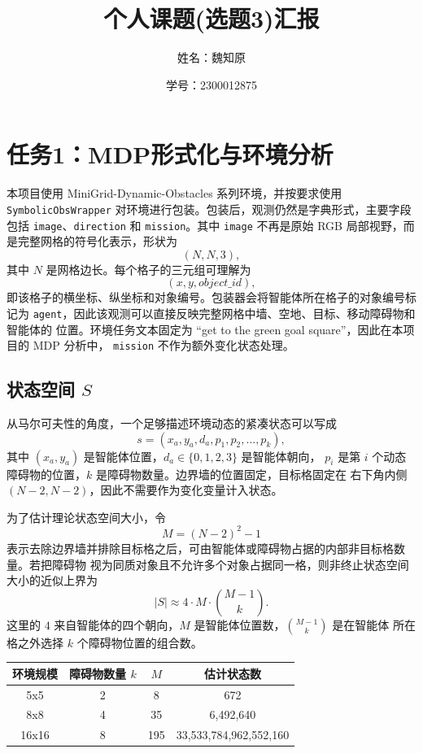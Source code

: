 \documentclass[UTF8,a4paper,fontset=fandol]{ctexart}
\title{个人课题(选题3)汇报}
\author{姓名：魏知原}
\date{学号：2300012875}
\begin{document}
\pagestyle{plain}
\maketitle

\section{任务1：MDP形式化与环境分析}

本项目使用 MiniGrid-Dynamic-Obstacles 系列环境，并按要求使用
\texttt{SymbolicObsWrapper} 对环境进行包装。包装后，观测仍然是字典形式，主要字段包括
\texttt{image}、\texttt{direction} 和 \texttt{mission}。其中 \texttt{image} 不再是原始
RGB 局部视野，而是完整网格的符号化表示，形状为
\[
    (N, N, 3),
\]
其中 \(N\) 是网格边长。每个格子的三元组可理解为
\[
    (x, y, object\_id),
\]
即该格子的横坐标、纵坐标和对象编号。包装器会将智能体所在格子的对象编号标记为
\texttt{agent}，因此该观测可以直接反映完整网格中墙、空地、目标、移动障碍物和智能体的
位置。环境任务文本固定为 ``get to the green goal square''，因此在本项目的 MDP 分析中，
\texttt{mission} 不作为额外变化状态处理。

\subsection{状态空间 \(S\)}

从马尔可夫性的角度，一个足够描述环境动态的紧凑状态可以写成
\[
    s = (x_a, y_a, d_a, p_1, p_2, \ldots, p_k),
\]
其中 \((x_a, y_a)\) 是智能体位置，\(d_a \in \{0,1,2,3\}\) 是智能体朝向，
\(p_i\) 是第 \(i\) 个动态障碍物的位置，\(k\) 是障碍物数量。边界墙的位置固定，目标格固定在
右下角内侧 \((N-2, N-2)\)，因此不需要作为变化变量计入状态。

为了估计理论状态空间大小，令
\[
    M = (N-2)^2 - 1
\]
表示去除边界墙并排除目标格之后，可由智能体或障碍物占据的内部非目标格数量。若把障碍物
视为同质对象且不允许多个对象占据同一格，则非终止状态空间大小的近似上界为
\[
    |S| \approx 4 \cdot M \cdot \binom{M-1}{k}.
\]
这里的 \(4\) 来自智能体的四个朝向，\(M\) 是智能体位置数，\(\binom{M-1}{k}\) 是在智能体
所在格之外选择 \(k\) 个障碍物位置的组合数。

\begin{center}
\begin{tabular}{c|c|c|c}
环境规模 & 障碍物数量 \(k\) & \(M\) & 估计状态数 \\
\hline
5x5 & 2 & 8 & 672 \\
8x8 & 4 & 35 & 6,492,640 \\
16x16 & 8 & 195 & 33,533,784,962,552,160 \\
\end{tabular}
\end{center}
\end{document}

